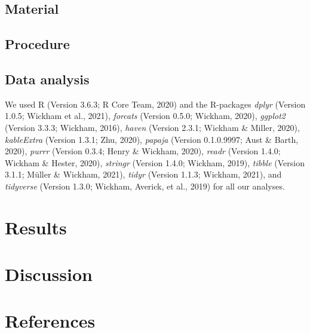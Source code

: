 \documentclass[
  english,
  doc,floatsintext]{apa6}
\begin{document}
\hypertarget{material}{%
\subsection{Material}\label{material}}

\hypertarget{procedure}{%
\subsection{Procedure}\label{procedure}}

\hypertarget{data-analysis}{%
\subsection{Data analysis}\label{data-analysis}}

We used R (Version 3.6.3; R Core Team, 2020) and the R-packages \emph{dplyr} (Version 1.0.5; Wickham et al., 2021), \emph{forcats} (Version 0.5.0; Wickham, 2020), \emph{ggplot2} (Version 3.3.3; Wickham, 2016), \emph{haven} (Version 2.3.1; Wickham \& Miller, 2020), \emph{kableExtra} (Version 1.3.1; Zhu, 2020), \emph{papaja} (Version 0.1.0.9997; Aust \& Barth, 2020), \emph{purrr} (Version 0.3.4; Henry \& Wickham, 2020), \emph{readr} (Version 1.4.0; Wickham \& Hester, 2020), \emph{stringr} (Version 1.4.0; Wickham, 2019), \emph{tibble} (Version 3.1.1; Müller \& Wickham, 2021), \emph{tidyr} (Version 1.1.3; Wickham, 2021), and \emph{tidyverse} (Version 1.3.0; Wickham, Averick, et al., 2019) for all our analyses.

\hypertarget{results}{%
\section{Results}\label{results}}

\hypertarget{discussion}{%
\section{Discussion}\label{discussion}}

\newpage

\hypertarget{references}{%
\section{References}\label{references}}

\begingroup
\setlength{\parindent}{-0.5in}
\setlength{\leftskip}{0.5in}
\end{document}
